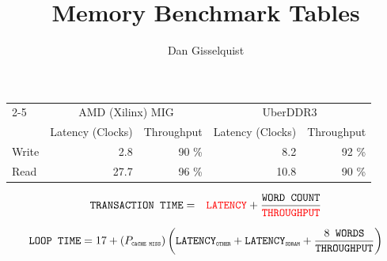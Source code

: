 \documentclass[11pt]{article}
\newcommand{\unknown}[1]{\textcolor{red}{#1}}
\begin{document}
\title{Memory Benchmark Tables}
\author{Dan Gisselquist}
\maketitle

\begin{tabular}{l|r|r|r|r|}\cline{2-5}
& \multicolumn{2}{c|}{AMD (Xilinx) MIG} & \multicolumn{2}{c|}{UberDDR3} \\ %
& Latency (Clocks) & Throughput & Latency (Clocks) & Throughput \\\hline\hline
Write &  2.8	& 90 \%	&  8.2	& 92 \% \\\hline
Read  & 27.7	& 96 \%	& 10.8	& 90 \% \\\hline
\end{tabular}

\begin{eqnarray*}
\mbox{\tt TRANSACTION TIME} &=& \mbox{\tt \unknown{LATENCY}} + \frac{\mbox{\tt WORD COUNT}}{\mbox{\tt \unknown{THROUGHPUT}}}
\end{eqnarray*}

\begin{eqnarray*}
\mbox{\tt LOOP TIME} = 17 + (P_{\mbox{\tiny\tt CACHE MISS}})\left(
	\mbox{\tt LATENCY}_{\mbox{\tiny\tt OTHER}}
	+ \mbox{\tt LATENCY}_{\mbox{\tiny\tt SDRAM}}
		+ \frac{8 {\mbox{\tt\ WORDS}}}{\mbox{\tt THROUGHPUT}}\right)
\end{eqnarray*}
\end{document}
